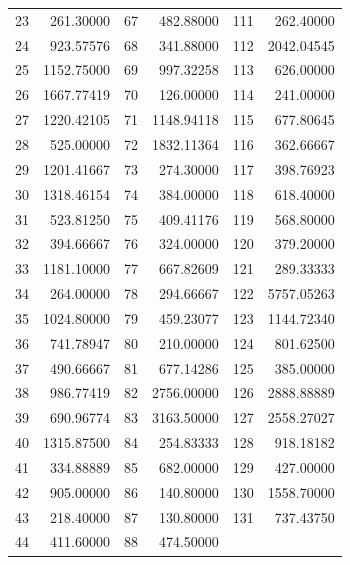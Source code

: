 \documentclass[11pt]{article}
\begin{document}
\begin{longtable}{r r r r r r}
23 & 261.30000 & 67 & 482.88000 & 111 & 262.40000\\
24 & 923.57576 & 68 & 341.88000 & 112 & 2042.04545\\
25 & 1152.75000 & 69 & 997.32258 & 113 & 626.00000\\
26 & 1667.77419 & 70 & 126.00000 & 114 & 241.00000\\
27 & 1220.42105 & 71 & 1148.94118 & 115 & 677.80645\\
28 & 525.00000 & 72 & 1832.11364 & 116 & 362.66667\\
29 & 1201.41667 & 73 & 274.30000 & 117 & 398.76923\\
30 & 1318.46154 & 74 & 384.00000 & 118 & 618.40000\\
31 & 523.81250 & 75 & 409.41176 & 119 & 568.80000\\
32 & 394.66667 & 76 & 324.00000 & 120 & 379.20000\\
33 & 1181.10000 & 77 & 667.82609 & 121 & 289.33333\\
34 & 264.00000 & 78 & 294.66667 & 122 & 5757.05263\\
35 & 1024.80000 & 79 & 459.23077 & 123 & 1144.72340\\
36 & 741.78947 & 80 & 210.00000 & 124 & 801.62500\\
37 & 490.66667 & 81 & 677.14286 & 125 & 385.00000\\
38 & 986.77419 & 82 & 2756.00000 & 126 & 2888.88889\\
39 & 690.96774 & 83 & 3163.50000 & 127 & 2558.27027\\
40 & 1315.87500 & 84 & 254.83333 & 128 & 918.18182\\
41 & 334.88889 & 85 & 682.00000 & 129 & 427.00000\\
42 & 905.00000 & 86 & 140.80000 & 130 & 1558.70000\\
43 & 218.40000 & 87 & 130.80000 & 131 & 737.43750\\
44 & 411.60000 & 88 & 474.50000 &  & \\
\bottomrule\end{longtable}
\end{document}
